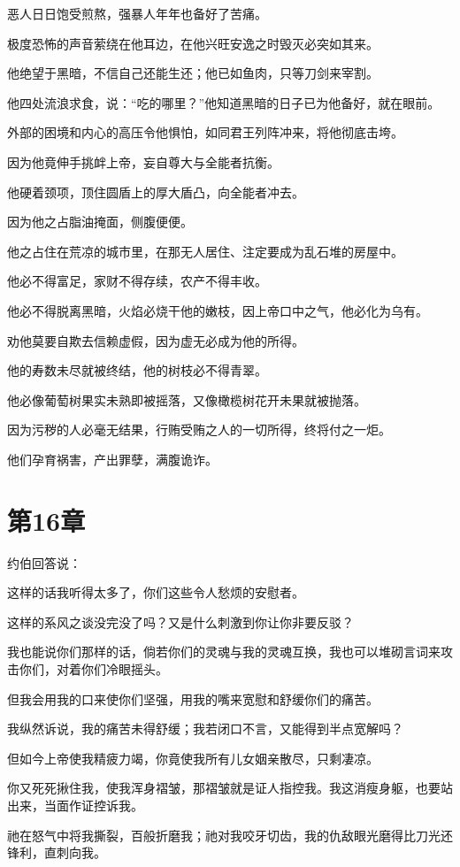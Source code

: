 \documentclass[12pt,oneside]{book}
\begin{document}
恶人日日饱受煎熬，强暴人年年也备好了苦痛。

极度恐怖的声音萦绕在他耳边，在他兴旺安逸之时毁灭必突如其来。

他绝望于黑暗，不信自己还能生还；他已如鱼肉，只等刀剑来宰割。

他四处流浪求食，说：“吃的哪里？”他知道黑暗的日子已为他备好，就在眼前。

外部的困境和内心的高压令他惧怕，如同君王列阵冲来，将他彻底击垮。

因为他竟伸手挑衅上帝，妄自尊大与全能者抗衡。

他硬着颈项，顶住圆盾上的厚大盾凸，向全能者冲去。

因为他之占脂油掩面，侧腹便便。

他之占住在荒凉的城市里，在那无人居住、注定要成为乱石堆的房屋中。

他必不得富足，家财不得存续，农产不得丰收。

他必不得脱离黑暗，火焰必烧干他的嫩枝，因上帝口中之气，他必化为乌有。

劝他莫要自欺去信赖虚假，因为虚无必成为他的所得。

他的寿数未尽就被终结，他的树枝必不得青翠。

他必像葡萄树果实未熟即被摇落，又像橄榄树花开未果就被抛落。

因为污秽的人必毫无结果，行贿受贿之人的一切所得，终将付之一炬。

他们孕育祸害，产出罪孽，满腹诡诈。



\chapter{第16章}
约伯回答说：

这样的话我听得太多了，你们这些令人愁烦的安慰者。

这样的系风之谈没完没了吗？又是什么刺激到你让你非要反驳？

我也能说你们那样的话，倘若你们的灵魂与我的灵魂互换，我也可以堆砌言词来攻击你们，对着你们冷眼摇头。

但我会用我的口来使你们坚强，用我的嘴来宽慰和舒缓你们的痛苦。

我纵然诉说，我的痛苦未得舒缓；我若闭口不言，又能得到半点宽解吗？

但如今上帝使我精疲力竭，你竟使我所有儿女姻亲散尽，只剩凄凉。

你又死死揪住我，使我浑身褶皱，那褶皱就是证人指控我。我这消瘦身躯，也要站出来，当面作证控诉我。

祂在怒气中将我撕裂，百般折磨我；祂对我咬牙切齿，我的仇敌眼光磨得比刀光还锋利，直刺向我。
\end{document}
